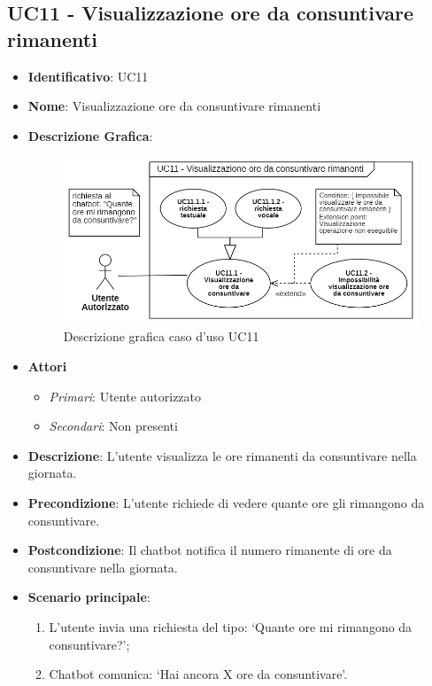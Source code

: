 \subsection{UC11 - Visualizzazione ore da consuntivare rimanenti }
\begin{itemize}
	\item \textbf{Identificativo}: UC11
	\item \textbf{Nome}: Visualizzazione ore da consuntivare rimanenti
	\item \textbf{Descrizione Grafica}:
	\begin{figure}[h]
		\centering
		\includegraphics[scale=0.80]{images/UC11.png} 
		\caption{Descrizione grafica caso d'uso UC11}
	 \end{figure}

	\item \textbf{Attori}
	\begin{itemize} 
		\item \textit{Primari}: Utente autorizzato
		\item \textit{Secondari}: Non presenti
	\end{itemize}
	\item \textbf{Descrizione}: L'utente visualizza le ore rimanenti da consuntivare nella giornata.
	\item \textbf{Precondizione}: L'utente richiede di vedere quante ore gli rimangono da consuntivare.
	\item \textbf{Postcondizione}: Il chatbot notifica il numero rimanente di ore da consuntivare nella giornata.
	\item \textbf{Scenario principale}: \begin{enumerate}
		\item L'utente invia una richiesta del tipo: `Quante ore mi rimangono da consuntivare?';
		\item Chatbot comunica: `Hai ancora X ore da consuntivare'.
	\end{enumerate}
\end{itemize}

